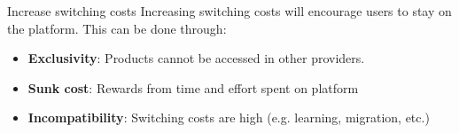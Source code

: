 \begin{knBox}
    {Increase switching costs}
    Increasing switching costs will encourage users to stay on the platform. This can be done through:
    \begin{itemize}
        \item \textbf{Exclusivity}: Products cannot be accessed in other providers.
        \item \textbf{Sunk cost}: Rewards from time and effort spent on platform
        \item \textbf{Incompatibility}: Switching costs are high (e.g. learning, migration, etc.)
    \end{itemize}
\end{knBox}